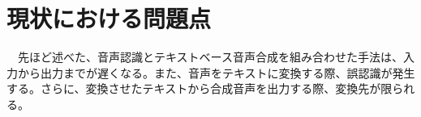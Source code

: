 \section{現状における問題点}
\par　先ほど述べた、音声認識とテキストベース音声合成を組み合わせた手法は、入力から出力までが遅くなる。また、音声をテキストに変換する際、誤認識が発生する。さらに、変換させたテキストから合成音声を出力する際、変換先が限られる。
